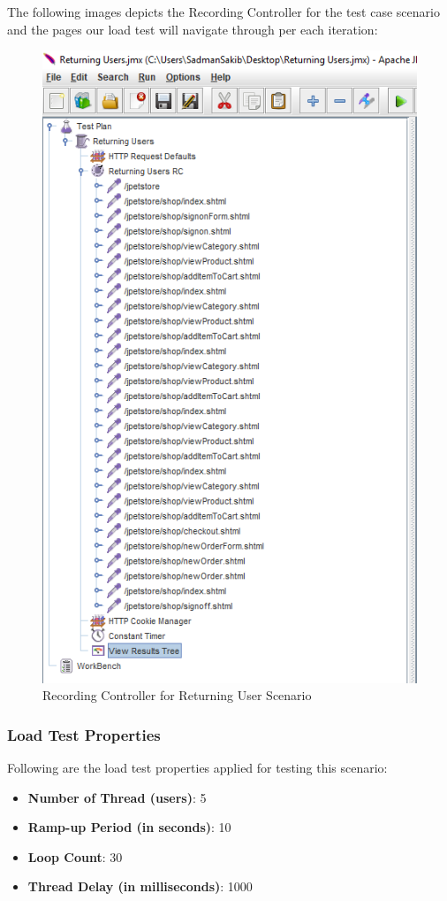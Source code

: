\documentclass[fontsize=12pt,paper=letter,twoside]{scrartcl}
\begin{document}
\newpage
\bigskip
\noindent The following images depicts the Recording Controller for the test case scenario and the pages our load test will navigate through per each iteration:

\begin{figure}[!htb]
\begin{center}
\includegraphics[width=.6\textwidth]{../../load-test/test-plans/returning-user/rc.png}
\end{center}
\caption{Recording Controller for Returning User Scenario}
\label{fig:ruser:rc}
\end{figure}

\clearpage
\subsubsection{Load Test Properties}
Following are the load test properties applied for testing this scenario:
\begin{itemize}
\item \textbf{Number of Thread (users)}: 5
\item \textbf{Ramp-up Period (in seconds)}: 10
\item \textbf{Loop Count}: 30
\item \textbf{Thread Delay (in milliseconds)}: 1000
\end{itemize}
\end{document}
